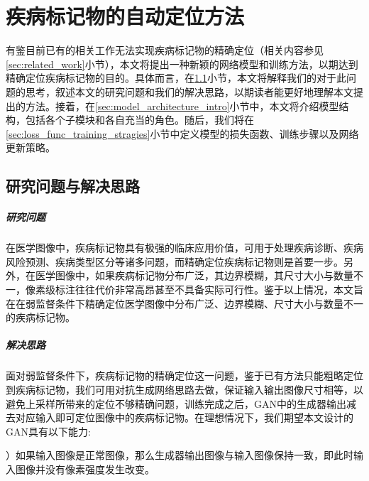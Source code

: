 \chapter{疾病标记物的自动定位方法}\label{sec:method}
有鉴目前已有的相关工作无法实现疾病标记物的精确定位（相关内容参见\ref{sec:related_work}小节），本文将提出一种新颖的网络模型和训练方法，以期达到精确定位疾病标记物的目的。具体而言，在\ref{sec:idea_thinking}小节，本文将解释我们的对于此问题的思考，叙述本文的研究问题和我们的解决思路，以期读者能更好地理解本文提出的方法。接着，在\ref{sec:model_architecture_intro}小节中，本文将介绍模型结构，包括各个子模块和各自充当的角色。随后，我们将在\ref{sec:loss_func_training_stragies}小节中定义模型的损失函数、训练步骤以及网络更新策略。

\section{研究问题与解决思路}\label{sec:idea_thinking}
\paragraph{研究问题} 在医学图像中，疾病标记物具有极强的临床应用价值，可用于处理疾病诊断、疾病风险预测、疾病类型区分等诸多问题，而精确定位疾病标记物则是首要一步。另外，在医学图像中，如果疾病标记物分布广泛，其边界模糊，其尺寸大小与数量不一，像素级标注往往代价非常高昂甚至不具备实际可行性。鉴于以上情况，本文旨在在弱监督条件下精确定位医学图像中分布广泛、边界模糊、尺寸大小与数量不一的疾病标记物。

\paragraph{解决思路} 面对弱监督条件下，疾病标记物的精确定位这一问题，鉴于已有方法只能粗略定位到疾病标记物，我们可用对抗生成网络思路去做，保证输入输出图像尺寸相等，以避免上采样所带来的定位不够精确问题，训练完成之后，GAN中的生成器输出减去对应输入即可定位图像中的疾病标记物。在理想情况下，我们期望本文设计的GAN具有以下能力:

）如果输入图像是正常图像，那么生成器输出图像与输入图像保持一致，即此时输入图像并没有像素强度发生改变。
	
